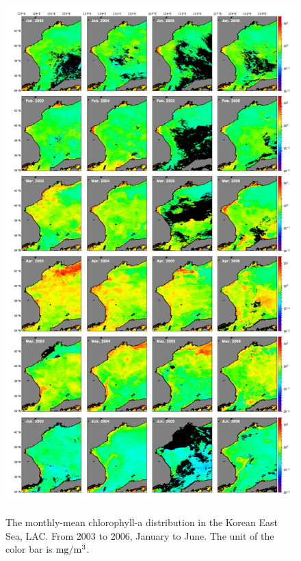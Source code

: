 \begin{figure}[t]
	\centering
	\includegraphics[width=0.8\linewidth]{../images/noname01}\\
	\caption{The monthly-mean chlorophyll-a distribution in the Korean East Sea, LAC. From 2003 to 2006, January to June. The unit of the color bar is $\rm mg/m^3$.}
	\label{fig:noname01}
\end{figure}
 

